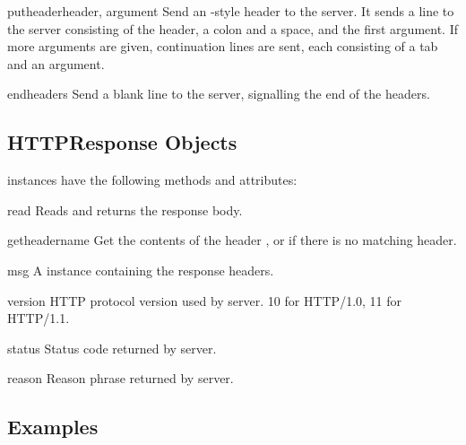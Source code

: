 \begin{methoddesc}{putheader}{header, argument}
Send an -style header to the server.  It sends a line to the
server consisting of the header, a colon and a space, and the first
argument.  If more arguments are given, continuation lines are sent,
each consisting of a tab and an argument.
\end{methoddesc}

\begin{methoddesc}{endheaders}{}
Send a blank line to the server, signalling the end of the headers.
\end{methoddesc}


\subsection{HTTPResponse Objects \label{httpresponse-objects}}

 instances have the following methods and attributes:

\begin{methoddesc}{read}{}
Reads and returns the response body.
\end{methoddesc}

\begin{methoddesc}{getheader}{name}
Get the contents of the header , or  if there is no
matching header.
\end{methoddesc}

\begin{datadesc}{msg}
  A  instance containing the response headers.
\end{datadesc}

\begin{datadesc}{version}
  HTTP protocol version used by server.  10 for HTTP/1.0, 11 for HTTP/1.1.
\end{datadesc}

\begin{datadesc}{status}
  Status code returned by server.
\end{datadesc}

\begin{datadesc}{reason}
  Reason phrase returned by server.
\end{datadesc}


\subsection{Examples \label{httplib-examples}}

